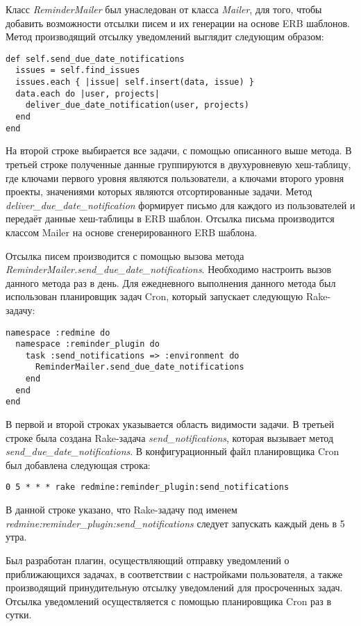 Класс \textit{ReminderMailer} был унаследован от класса \textit{Mailer}, для
того, чтобы добавить возможности отсылки писем и их генерации на основе ERB
шаблонов. Метод производящий отсылку уведомлений выглядит следующим образом:
\small{\begin{lstlisting}
def self.send_due_date_notifications
  issues = self.find_issues
  issues.each { |issue| self.insert(data, issue) }
  data.each do |user, projects|
    deliver_due_date_notification(user, projects)
  end
end
\end{lstlisting}}
На второй строке выбирается все задачи, с помощью описанного выше метода. В
третьей строке полученные данные группируются в двухуровневую хеш-таблицу, где
ключами первого уровня являются пользователи, а ключами второго уровня проекты,
значениями которых являются отсортированные задачи. Метод
\textit{deliver\_due\_date\_notification} формирует письмо для каждого из
пользователей и передаёт данные хеш-таблицы в ERB шаблон. Отсылка письма
производится классом Mailer на основе сгенерированного ERB шаблона.

Отсылка писем производится с помощью вызова метода
\textit{ReminderMailer.send\_due\_date\_notifications}. Необходимо настроить
вызов данного метода раз в день. Для ежедневного выполнения данного метода был
использован планировщик задач Cron, который запускает следующую Rake-задачу:
\small{\begin{lstlisting}
namespace :redmine do
  namespace :reminder_plugin do
    task :send_notifications => :environment do
      ReminderMailer.send_due_date_notifications
    end
  end
end
\end{lstlisting}}
В первой и второй строках указывается область видимости задачи. В третьей
строке была создана Rake-задача \textit{send\_notifications}, которая вызывает
метод \textit{send\_due\_date\_notifications}. В конфигурационный файл
планировщика Cron был добавлена следующая строка:
\small{\begin{lstlisting}
0 5 * * * rake redmine:reminder_plugin:send_notifications
\end{lstlisting}}
В данной строке указано, что Rake-задачу под именем
\textit{redmine:reminder\_plugin:send\_notifications} следует запускать каждый
день в 5 утра.

Был разработан плагин, осуществляющий отправку уведомлений о приближающихся
задачах, в соответствии с настройками пользователя, а также производящий
принудительную отсылку уведомлений для просроченных задач. Отсылка уведомлений
осуществляется с помощью планировщика Cron раз в сутки.

